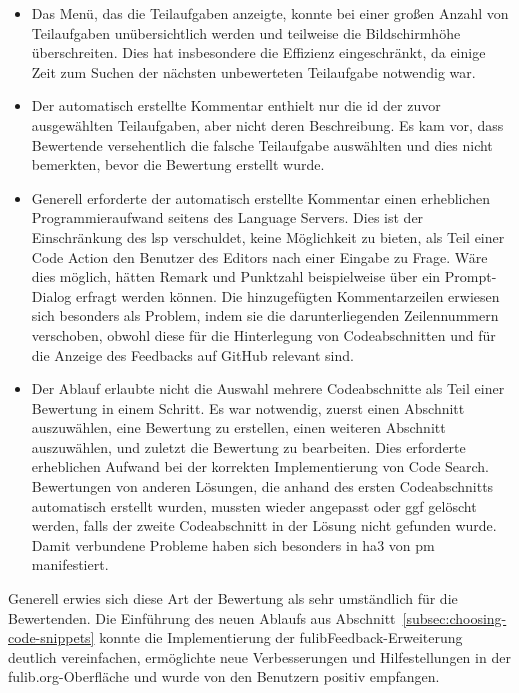 \begin{itemize}
    \item Das Menü, das die Teilaufgaben anzeigte, konnte bei einer großen Anzahl von Teilaufgaben unübersichtlich werden und teilweise die Bildschirmhöhe überschreiten.
    Dies hat insbesondere die Effizienz eingeschränkt, da einige Zeit zum Suchen der nächsten unbewerteten Teilaufgabe notwendig war.
    \item Der automatisch erstellte Kommentar enthielt nur die \ac{id} der zuvor ausgewählten Teilaufgaben, aber nicht deren Beschreibung.
    Es kam vor, dass Bewertende versehentlich die falsche Teilaufgabe auswählten und dies nicht bemerkten, bevor die Bewertung erstellt wurde.
    \item Generell erforderte der automatisch erstellte Kommentar einen erheblichen Programmieraufwand seitens des Language Servers.
    Dies ist der Einschränkung des \ac{lsp} verschuldet, keine Möglichkeit zu bieten, als Teil einer Code Action den Benutzer des Editors nach einer Eingabe zu Frage.
    Wäre dies möglich, hätten Remark und Punktzahl beispielweise über ein Prompt-Dialog erfragt werden können.
    Die hinzugefügten Kommentarzeilen erwiesen sich besonders als Problem, indem sie die darunterliegenden Zeilennummern verschoben, obwohl diese für die Hinterlegung von Codeabschnitten und für die Anzeige des Feedbacks auf GitHub relevant sind.
    \item Der Ablauf erlaubte nicht die Auswahl mehrere Codeabschnitte als Teil einer Bewertung in einem Schritt.
    Es war notwendig, zuerst einen Abschnitt auszuwählen, eine Bewertung zu erstellen, einen weiteren Abschnitt auszuwählen, und zuletzt die Bewertung zu bearbeiten.
    Dies erforderte erheblichen Aufwand bei der korrekten Implementierung von Code Search.
    Bewertungen von anderen Lösungen, die anhand des ersten Codeabschnitts automatisch erstellt wurden, mussten wieder angepasst oder \ac{ggf} gelöscht werden, falls der zweite Codeabschnitt in der Lösung nicht gefunden wurde.
    Damit verbundene Probleme haben sich besonders in \ac{ha}3 von \ac{pm} manifestiert.
\end{itemize}

Generell erwies sich diese Art der Bewertung als sehr umständlich für die Bewertenden.
Die Einführung des neuen Ablaufs aus Abschnitt~\ref{subsec:choosing-code-snippets} konnte die Implementierung der fulibFeedback-Erweiterung deutlich vereinfachen, ermöglichte neue Verbesserungen und Hilfestellungen in der fulib.org-Oberfläche und wurde von den Benutzern positiv empfangen.

